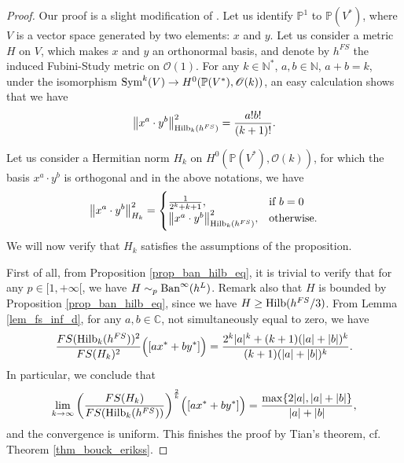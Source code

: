 \documentclass[12pt]{article}
\numberwithin{equation}{section}
\theoremstyle{theorem}
\theoremstyle{definition}
\theoremstyle{remark}
\newcommand{\comp}{\mathbb{C}}
\newcommand{\nat}{\mathbb{N}}
\begin{document}
	\begin{proof}
		Our proof is a slight modification of \cite[Proposition 4.16]{FinSecRing}.
		Let us identify $\mathbb{P}^1$ to $\mathbb{P}(V^*)$, where $V$ is a vector space generated by two elements: $x$ and $y$.
		Let us consider a metric $H$ on $V$, which makes $x$ and $y$ an orthonormal basis, and denote by $h^{FS}$ the induced Fubini-Study metric on $\mathscr{O}(1)$.
		For any $k \in \nat^*$, $a, b \in \nat$, $a + b = k$, under the isomorphism ${\rm{Sym}}^k(V) \to H^0(\mathbb{P}(V^*), \mathscr{O}(k))$, an easy calculation shows that we have
		\begin{equation}\label{eq_l2_norm_calc}
			\big\| x^a \cdot y^b \big\|_{{\rm{Hilb}}_k(h^{FS})}^2
			=
			\frac{a! b!}{(k + 1)!}.
		\end{equation}
		\par
		Let us consider a Hermitian norm $H_k$ on $H^0(\mathbb{P}(V^*), \mathscr{O}(k))$, for which the basis $x^a \cdot y^b$ is orthogonal and in the above notations, we have
		\begin{equation}
			\big\| x^a \cdot y^b \big\|_{H_k}^2
			=
			\begin{cases}
				\frac{1}{2^k + k + 1}, &\text{if } b = 0 \\
				\big\| x^a \cdot y^b \big\|_{{\rm{Hilb}}_k(h^{FS})}^2 ,  &\text{otherwise}.
			\end{cases}
		\end{equation}
		We will now verify that $H_k$ satisfies the assumptions of the proposition.
		\par 
		First of all, from Proposition \ref{prop_ban_hilb_eq}, it is trivial to verify that for any $p \in [1, +\infty[$, we have $H \sim_p {\rm{Ban}}^{\infty}(h^L)$.
		Remark also that $H$ is bounded by Proposition \ref{prop_ban_hilb_eq}, since we have $H \geq {\rm{Hilb}}(h^{FS} / 3)$.
		From Lemma \ref{lem_fs_inf_d}, for any $a, b \in \comp$, not simultaneously equal to zero, we have
	 	\begin{equation}\label{eq_expl_exmpl11}
	 		\frac{FS({\rm{Hilb}}_{k}(h^{FS}))^2}{FS(H_{k})^2} \Big([a x^* + b y^*] \Big)
	 		=
	 		\frac{2^k |a|^k + (k + 1) (|a| + |b|)^{k}}{(k + 1) (|a| + |b|)^{k}}.
	 	\end{equation}
	 	In particular, we conclude that 
	 	\begin{equation}
	 		\lim_{k \to \infty} \bigg( \frac{FS(H_{k})}{FS({\rm{Hilb}}_{k}(h^{FS}))} \bigg)^{\frac{2}{k}} \Big([a x^* + b y^*] \Big)
	 		=
	 		\frac{\max\{2 |a|, |a| + |b|\}}{|a| + |b|},
	 	\end{equation}
	 	and the convergence is uniform. 
	 	This finishes the proof by Tian's theorem, cf. Theorem \ref{thm_bouck_erikss}.
	\end{proof}
\end{document}
